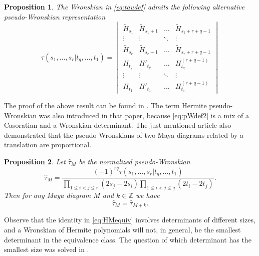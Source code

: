 \documentclass{amsart}
\newtheorem{proposition}{Proposition}
\theoremstyle{definition}
\newcommand{\Z}{\mathbb{Z}}
\newcommand{\htau}{\hat{\tau}}
\renewcommand{\th}{\tilde{H}}
\newcommand{\h}{H}
\begin{document}
\begin{proposition} The Wronskian in \eqref{eq:taudef} admits the following
  alternative \emph{pseudo-Wronskian} representation
  \begin{equation}\label{eq:pWdef2} \tau(s_1,\ldots, s_r | t_q,\ldots,
    t_1)=
    \begin{vmatrix} \th_{s_1} & \th_{s_1+1} & \ldots &
      \th_{s_1+r+q-1}\\ \vdots & \vdots & \ddots & \vdots\\ \th_{s_r} &
      \th_{s_r+1} & \ldots & \th_{s_r+r+q-1}\\ \h_{t_q} &  \h'_{t_q} &
      \ldots & \h^{(r+q-1)}_{t_q}\\ \vdots & \vdots & \ddots & \vdots\\
      \h_{t_1} & \h'_{t_1} & \ldots & \h^{(r+q-1)}_{t_1}
    \end{vmatrix}
  \end{equation}

\end{proposition} 
\noindent
The proof of the above result can be found in \cite{gomez2018durfee}.
The term Hermite pseudo-Wronskian was also introduced in that paper,
because \eqref{eq:pWdef2} is a mix of a Casoratian and a Wronskian
determinant.  The just mentioned article also demonstrated that the
pseudo-Wronskians of two Maya diagrams related by a translation are
proportional.
\begin{proposition}\label{prop:equiv}
  Let  $\htau_M $ be the normalized pseudo-Wronskian
  \begin{equation}
    \label{eq:hHdef}
    \htau_M = \frac{(-1)^{rq}\tau(s_1,\ldots, s_r|t_q,\ldots, t_1)}{\prod_{1\leq i<j\leq r} (2s_j-2s_i)\prod_{1\leq
        i<j\leq q}
      (2 t_i-2t_j)}.
  \end{equation}
Then for any Maya diagram $M$ and $k\in\Z$ we have
  \begin{equation} \label{eq:HMequiv}
       \htau_M =  \htau_{M+k}.
  \end{equation}
\end{proposition}
\noindent
Observe that the identity in \eqref{eq:HMequiv} involves determinants
of different sizes, and a Wronskian of Hermite polynomials will not,
in general, be the smallest determinant in the equivalence class.  The
question of which determinant has the smallest size was solved in
\cite{gomez2018durfee}.


\end{document}
